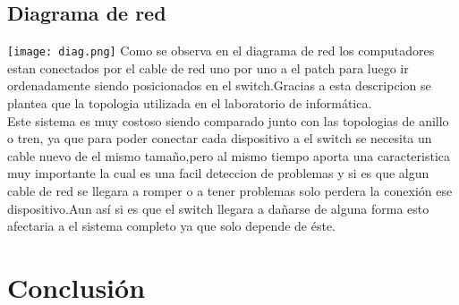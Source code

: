 \documentclass{udpreport}
\begin{document}
\section{Diagrama de red}
\texttt{[image: diag.png]}
Como se observa en el diagrama de red los computadores estan conectados por el cable de red uno por uno 
a el patch para luego ir ordenadamente siendo posicionados en el switch.Gracias a esta descripcion se 
plantea que la topologia utilizada en el laboratorio de informática. \\
Este sistema es muy costoso siendo comparado junto con las topologias de anillo o tren, ya que para poder
conectar cada dispositivo a el switch se necesita un cable nuevo de el mismo tamaño,pero al mismo tiempo
aporta una caracteristica muy importante la cual es una facil deteccion de problemas y si es que algun
cable de red se llegara a romper o a tener problemas solo perdera la conexión  ese dispositivo.Aun así 
si es que el switch llegara a dañarse de alguna forma esto afectaria a el sistema completo ya que solo
depende de éste.
\chapter{Conclusión}
\end{document}
